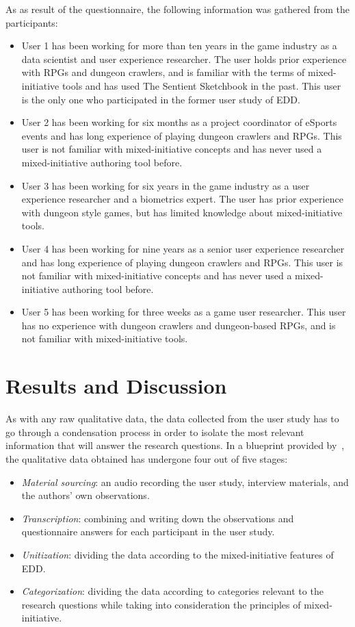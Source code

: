 \documentclass[sigconf]{acmart}
\begin{document}
As as result of the questionnaire, the following information was gathered from the participants:
\begin{itemize}
\item User 1 has been working for more than ten years in the game industry as a data scientist and user experience researcher. The user holds prior experience with RPGs and dungeon crawlers, and is familiar with the terms of mixed-initiative tools and has used The Sentient Sketchbook in the past. This user is the only one who participated in the former user study of EDD.
\item User 2 has been working for six months as a project coordinator of eSports events and has long experience of playing dungeon crawlers and RPGs. This user is not familiar with mixed-initiative concepts and has never used a mixed-initiative authoring tool before.
\item User 3 has been working for six years in the game industry as a user experience researcher and a biometrics expert. The user has prior experience with dungeon style games, but has limited knowledge about mixed-initiative tools.
\item User 4 has been working for nine years as a senior user experience researcher and has long experience of playing dungeon crawlers and RPGs. This user is not familiar with mixed-initiative concepts and has never used a mixed-initiative authoring tool before. 
\item User 5 has been working for three weeks as a game user researcher. This user has no experience with dungeon crawlers and dungeon-based RPGs, and is not familiar with mixed-initiative tools. 
\end{itemize}

\section{Results and Discussion} \label{conclusion} 

As with any raw qualitative data, the data collected from the user study has to go through a condensation process in order to isolate the most relevant information that will answer the research questions. In a blueprint provided by~\citet{srnka2007words}, the qualitative data obtained has undergone four out of five stages: 
\begin{itemize}
\item \textit{Material sourcing}: an audio recording the user study, interview materials, and the authors’ own observations.
\item \textit{Transcription}: combining and writing down the observations and questionnaire answers for each participant in the user study.
\item \textit{Unitization}: dividing the data according to the mixed-initiative features of EDD.
\item \textit{Categorization}: dividing the data according to categories relevant to the research questions while taking into consideration the principles of mixed-initiative.
\end{itemize}
\end{document}
